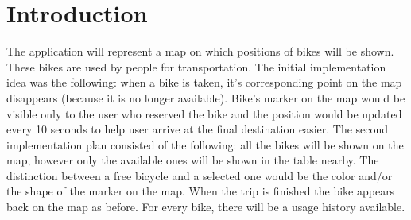 \section{Introduction}

The application will represent a map on which positions of bikes will be shown. These bikes are used by people
for transportation. The initial implementation idea was the following: when a bike is taken, it’s corresponding point on the map disappears (because it is no longer available). Bike's marker on the map would be visible only to the user who reserved the bike and the position would be updated every 10 seconds to help user arrive at the final destination easier. The second implementation plan consisted of the following: all the bikes will be shown on the map, however only the available ones will be shown in the table nearby. The distinction between a free bicycle and a selected one would be the color and/or the shape of the marker on the map. When the trip is finished the bike appears back on the map as before. For every bike, there will be a usage history available.
